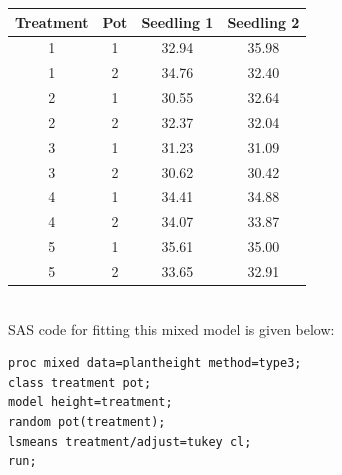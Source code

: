 \begin{small}
\begin{center}
\begin{tabular}{cc|cc}
Treatment & Pot & Seedling 1 & Seedling 2 \\ \hline
1          &       1       &      32.94      &      35.98 \\
1          &       2       &      34.76      &      32.40 \\
2          &       1       &      30.55      &      32.64 \\
2          &       2       &      32.37      &      32.04 \\
3          &       1       &      31.23      &      31.09 \\
3          &       2       &      30.62      &      30.42 \\
4          &       1       &      34.41      &      34.88 \\
4          &       2       &      34.07      &      33.87 \\
5          &       1       &      35.61      &      35.00 \\
5          &       2       &      33.65      &      32.91 \\ \hline
\end{tabular}
\end{center}
\end{small}
~\\
SAS code for fitting this mixed model is given below:\\
	
\begin{small}
\begin{verbatim}
proc mixed data=plantheight method=type3;
class treatment pot;
model height=treatment;
random pot(treatment);
lsmeans treatment/adjust=tukey cl;
run;
\end{verbatim}
\end{small}

